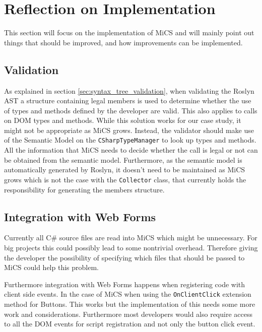\section{Reflection on Implementation} %
\label{sec:reflection_on_implementation}
This section will focus on the implementation of MiCS and will mainly point out things that should be improved, and how improvements can be implemented.

\subsection{Validation} %
\label{ssub:validation}
As explained in section \ref{sec:syntax_tree_validation}, when validating the Roslyn AST a structure containing legal members is used to determine whether the use of types and methods defined by the developer are valid. This also applies to calls on DOM types and methods. While this solution works for our case study, it might not be appropriate as MiCS grows. Instead, the validator should make use of the Semantic Model on the \texttt{CSharpTypeManager} to look up types and methods. All the information that MiCS needs to decide whether the call is legal or not can be obtained from the semantic model. Furthermore, as the semantic model is automatically generated by Roslyn, it doesn't need to be maintained as MiCS grows which is not the case with the \texttt{Collector} class, that currently holds the responsibility for generating the members structure.

\subsection{Integration with Web Forms} %
\label{ssub:integration_with_web_forms}
	Currently all C\# source files are read into MiCS which might be unnecessary. For big projects this could possibly lead to some nontrivial overhead. Therefore giving the developer the possibility of specifying which files that should be passed to MiCS could help this problem.

	Furthermore integration with Web Forms happens when registering code with client side events. In the case of MiCS when using the \texttt{OnClientClick} extension method for Buttons. This works but the implementation of this needs some more work and considerations. Furthermore most developers would also require access to all the DOM events for script registration and not only the button click event.

